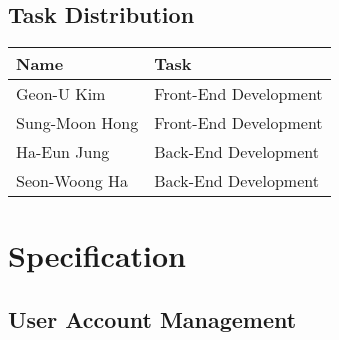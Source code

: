 \documentclass[conference]{IEEEtran}
\begin{document}
\subsection{Task Distribution}

\begin{table}[H] 
\renewcommand\arraystretch{1.25}
\centering 
\begin{threeparttable}
    \scriptsize
    \begin{tabular}{@{}p{3cm} p{5.3cm}@{}}
    \toprule
    \bfseries Name & \bfseries Task \\ 
    \midrule
    Geon-U Kim & Front-End Development \\ 
    Sung-Moon Hong & Front-End Development\\ 
    Ha-Eun Jung & Back-End Development\\ 
    Seon-Woong Ha & Back-End Development\\ 
    \bottomrule
    \end{tabular}
\end{threeparttable}
\end{table}

\section{Specification}

\subsection{User Account Management}
\end{document}
